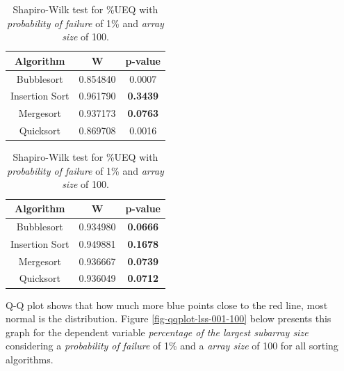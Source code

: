 \begin{table}[H]
    \parbox{.45\linewidth}{
        \caption{Shapiro-Wilk test for \%LSS with \textit{probability of failure} of 1\% and \textit{array size} of 100.}
        \begin{center}
        \begin{tabular}{|c|c|c|}
        \hline
        \textbf{Algorithm} & \textbf{W} & \textbf{p-value} \\
        \hline
        Bubblesort & 0.854840 & 0.0007 \\
        \hline
        Insertion Sort & 0.961790 & \textbf{0.3439} \\
        \hline
        Mergesort & 0.937173 & \textbf{0.0763} \\
        \hline
        Quicksort & 0.869708 & 0.0016 \\
        \hline
        \end{tabular}
        \label{table-shapiro-test-lss}
        \end{center}
    }
    \hfill
    \parbox{.45\linewidth}{
        \caption{Shapiro-Wilk test for \%UEQ with \textit{probability of failure} of 1\% and \textit{array size} of 100.}
        \begin{center}
        \begin{tabular}{|c|c|c|}
        \hline
        \textbf{Algorithm} & \textbf{W} & \textbf{p-value} \\
        \hline
        Bubblesort & 0.934980 & \textbf{0.0666} \\
        \hline
        Insertion Sort & 0.949881 & \textbf{0.1678} \\
        \hline
        Mergesort & 0.936667 & \textbf{0.0739} \\
        \hline
        Quicksort & 0.936049 & \textbf{0.0712} \\
        \hline
        \end{tabular}
        \label{table-shapiro-test-ueq}
        \end{center}
    }
\end{table}

Q-Q plot shows that how much more blue points close to the red line, most normal is the distribution. Figure \ref{fig-qqplot-lss-001-100} below presents this graph for the dependent variable \textit{percentage of the largest subarray size} considering a \textit{probability of failure} of 1\% and a \textit{array size} of 100 for all sorting algorithms. 

